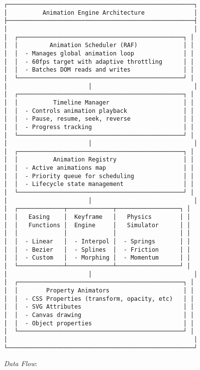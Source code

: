 \documentclass[11pt]{article}
\begin{document}
\begin{verbatim}
┌─────────────────────────────────────────────────────┐
│          Animation Engine Architecture              │
├─────────────────────────────────────────────────────┤
│                                                     │
│  ┌───────────────────────────────────────────────┐ │
│  │         Animation Scheduler (RAF)             │ │
│  │  - Manages global animation loop              │ │
│  │  - 60fps target with adaptive throttling      │ │
│  │  - Batches DOM reads and writes               │ │
│  └───────────────────────────────────────────────┘ │
│                       │                             │
│  ┌───────────────────────────────────────────────┐ │
│  │          Timeline Manager                     │ │
│  │  - Controls animation playback                │ │
│  │  - Pause, resume, seek, reverse               │ │
│  │  - Progress tracking                          │ │
│  └───────────────────────────────────────────────┘ │
│                       │                             │
│  ┌───────────────────────────────────────────────┐ │
│  │          Animation Registry                   │ │
│  │  - Active animations map                      │ │
│  │  - Priority queue for scheduling              │ │
│  │  - Lifecycle state management                 │ │
│  └───────────────────────────────────────────────┘ │
│                       │                             │
│  ┌─────────────┬─────────────┬──────────────────┐ │
│  │   Easing    │  Keyframe   │   Physics        │ │
│  │   Functions │  Engine     │   Simulator      │ │
│  │             │             │                  │ │
│  │  - Linear   │  - Interpol │  - Springs       │ │
│  │  - Bezier   │  - Splines  │  - Friction      │ │
│  │  - Custom   │  - Morphing │  - Momentum      │ │
│  └─────────────┴─────────────┴──────────────────┘ │
│                       │                             │
│  ┌───────────────────────────────────────────────┐ │
│  │        Property Animators                     │ │
│  │  - CSS Properties (transform, opacity, etc)   │ │
│  │  - SVG Attributes                             │ │
│  │  - Canvas drawing                             │ │
│  │  - Object properties                          │ │
│  └───────────────────────────────────────────────┘ │
│                                                     │
└─────────────────────────────────────────────────────┘
\end{verbatim}

\emph{Data Flow}:
\end{document}
